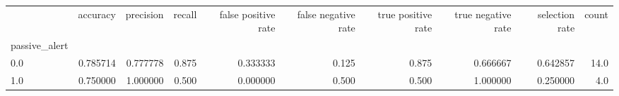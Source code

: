 \begin{tabular}{lrrrrrrrrr}
\toprule
{} &  accuracy &  precision &  recall &  false positive rate &  false negative rate &  true positive rate &  true negative rate &  selection rate &  count \\
passive\_alert &           &            &         &                      &                      &                     &                     &                 &        \\
\midrule
0.0           &  0.785714 &   0.777778 &   0.875 &             0.333333 &                0.125 &               0.875 &            0.666667 &        0.642857 &   14.0 \\
1.0           &  0.750000 &   1.000000 &   0.500 &             0.000000 &                0.500 &               0.500 &            1.000000 &        0.250000 &    4.0 \\
\bottomrule
\end{tabular}
